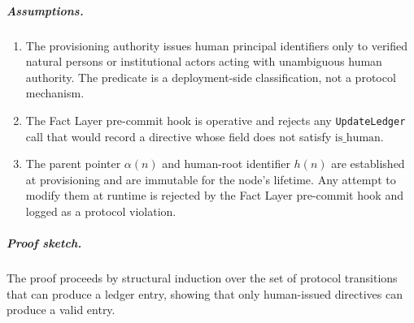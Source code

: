 \subparagraph{Assumptions.}
\begin{enumerate}
\item[\textbf{A3.1}] The provisioning authority issues human principal identifiers only to verified natural persons or institutional actors acting with unambiguous human authority. The  predicate is a deployment-side classification, not a protocol mechanism.
\item[\textbf{A3.2}] The Fact Layer pre-commit hook is operative and rejects any \texttt{UpdateLedger} call that would record a directive whose  field does not satisfy $\text{is\_human}$.
\item[\textbf{A3.3}] The parent pointer $\alpha(n)$ and human-root identifier $h(n)$ are established at provisioning and are immutable for the node's lifetime. Any attempt to modify them at runtime is rejected by the Fact Layer pre-commit hook and logged as a protocol violation.
\end{enumerate}

\subparagraph{Proof sketch.} The proof proceeds by structural induction over the set of protocol transitions that can produce a ledger entry, showing that only human-issued directives can produce a valid entry.

